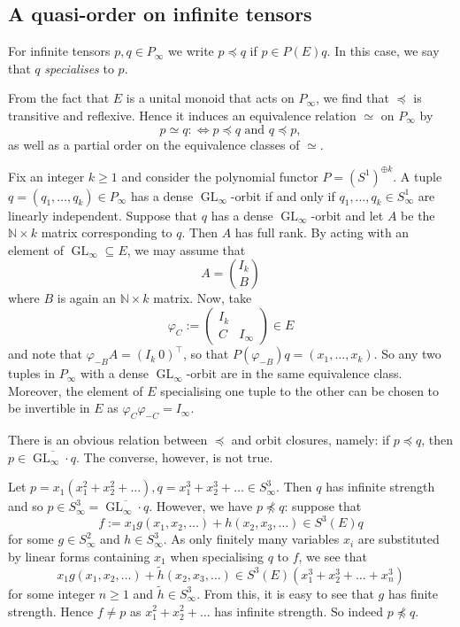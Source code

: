 \documentclass{amsart}
\theoremstyle{plain}
\theoremstyle{definition}
\newcommand{\NN}{\mathbb{N}}
\renewcommand{\phi}{\varphi}
\DeclareMathOperator{\GL}{GL}
\begin{document}
\subsection{A quasi-order on infinite tensors}\label{sec:quasiorder}

\begin{de}
For infinite tensors $p,q \in P_\infty$ we write $p \preceq q$ if $p \in P(E)q$. In this case, we say that $q$ {\em specialises} to $p$.
\end{de}

From the fact that $E$ is a unital monoid that acts on $P_\infty$,
we find that $\preceq$ is transitive and reflexive. Hence it induces an
equivalence relation $\simeq$ on $P_\infty$ by
\[
p \simeq q :\Leftrightarrow p \preceq q \text{ and } q \preceq p,
\]
as well as a partial order on the equivalence classes of $\simeq$.

\begin{ex}\label{ex:copiesS}
Fix an integer $k\geq1$ and consider the polynomial functor $P = (S^1)^{\oplus k}$. A tuple $q=(q_1,\ldots,q_k)\in P_{\infty}$ has a dense $\GL_{\infty}$-orbit if and only if $q_1,\ldots,q_k\in S^1_{\infty}$ are linearly independent. Suppose that $q$ has a dense $\GL_{\infty}$-orbit and let $A$ be the $\NN\times k$ matrix corresponding to $q$. Then $A$ has full rank. By acting with an element of $\GL_{\infty}\subseteq E$, we may assume that
\[
A=\binom{I_k}{B}
\]
where $B$ is again an $\NN\times k$ matrix. Now, take
\[
\phi_C:=\begin{pmatrix}
I_k\\C&I_{\infty}
\end{pmatrix}\in E
\]
and note that $\phi_{-B}A=(I_k~0)^\top$, so that $P(\phi_{-B})q=(x_1,\ldots,x_k)$. So any two tuples in $P_\infty$ with a dense $\GL_\infty$-orbit are in the same equivalence class. Moreover, the element of $E$ specialising one tuple to the other can be chosen to be invertible in $E$ as $\phi_{C}\varphi_{-C}=I_{\infty}$.
\end{ex}

There is an obvious relation between $\preceq$ and orbit closures, namely:
if $p \preceq q$, then $p \in \overline{\GL_\infty\!\cdot q}$. The converse,
however, is not true.

\begin{ex}
Let $p=x_1(x_1^2+x_2^2+\ldots),q=x_1^3+x_2^3+\ldots\in S^3_{\infty}$. Then $q$ has infinite strength and so $p\in S^3_{\infty}=\overline{\GL_{\infty}\!\cdot q}$. However, we have $p\not\preceq q$: suppose that
\[
f := x_1g(x_1,x_2,\ldots)+h(x_2,x_3,\ldots)\in S^3(E)q
\]
for some $g\in S^2_\infty$ and $h\in S^3_\infty$. As only finitely many variables $x_i$ are substituted by linear forms containing $x_1$ when specialising $q$ to $f$, we see that
\[
x_1g(x_1,x_2,\ldots)+\tilde{h}(x_2,x_3,\ldots)\in S^3(E)(x_1^3+x_2^3+\ldots+x_n^3)
\]
for some integer $n\geq 1$ and $\tilde{h}\in S^3_{\infty}$. From this, it is easy to see that $g$ has finite strength. Hence $f\neq p$ as $x_1^2+x_2^2+\ldots$ has infinite strength. So indeed $p\not\preceq q$.
\end{ex}
\end{document}
